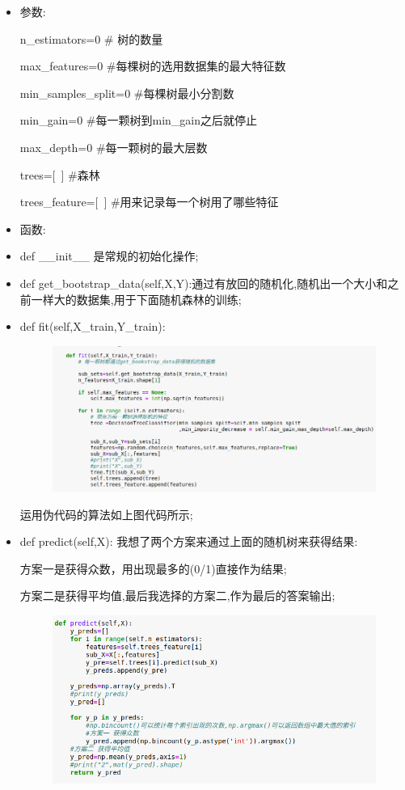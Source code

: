 \documentclass[11pt, a4paper, UTF8]{ctexart}
\begin{document}
\begin{solution}
\begin{enumerate}
\begin{enumerate}
\begin{enumerate}
\begin{itemize}
\item 参数:

n\_estimators=0 \# 树的数量

max\_features=0 \#每棵树的选用数据集的最大特征数

min\_samples\_split=0 \#每棵树最小分割数

min\_gain=0 \#每一颗树到min\_gain之后就停止

max\_depth=0 \#每一颗树的最大层数

trees=[~] \#森林

trees\_feature=[~] \#用来记录每一个树用了哪些特征
\item 函数:

\item def \_\_init\_\_ 是常规的初始化操作;
\item def get\_bootstrap\_data(self,X,Y):通过有放回的随机化,随机出一个大小和之前一样大的数据集,用于下面随机森林的训练;
\item def fit(self,X\_train,Y\_train):
\begin{figure}[!htbp]
	\centering
	\includegraphics[scale=0.49]{randomfit.png}
\end{figure}
运用伪代码的算法如上图代码所示;
\item def predict(self,X):
我想了两个方案来通过上面的随机树来获得结果:

方案一是获得众数，用出现最多的(0/1)直接作为结果;

方案二是获得平均值,最后我选择的方案二,作为最后的答案输出;
\begin{figure}[!htbp]
	\centering
	\includegraphics[scale=0.46]{randompredict.png}
\end{figure}


\end{itemize}
\end{enumerate}
\end{enumerate}
\end{enumerate}
\end{solution}
\end{document}
